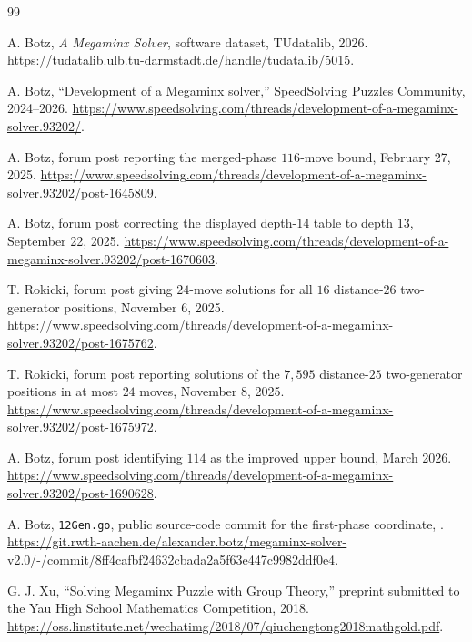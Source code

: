 \documentclass[11pt]{article}
\theoremstyle{definition}
\begin{document}
\small\raggedright
\begin{thebibliography}{99}

A. Botz,
\newblock \emph{A Megaminx Solver},
\newblock software dataset, TUdatalib, 2026.
\newblock \url{https://tudatalib.ulb.tu-darmstadt.de/handle/tudatalib/5015}.

A. Botz,
\newblock ``Development of a Megaminx solver,''
\newblock SpeedSolving Puzzles Community, 2024--2026.
\newblock \url{https://www.speedsolving.com/threads/development-of-a-megaminx-solver.93202/}.

A. Botz,
\newblock forum post reporting the merged-phase $116$-move bound,
\newblock February 27, 2025.
\newblock \url{https://www.speedsolving.com/threads/development-of-a-megaminx-solver.93202/post-1645809}.

A. Botz,
\newblock forum post correcting the displayed depth-$14$ table to depth $13$,
\newblock September 22, 2025.
\newblock \url{https://www.speedsolving.com/threads/development-of-a-megaminx-solver.93202/post-1670603}.

T. Rokicki,
\newblock forum post giving $24$-move solutions for all $16$ distance-$26$ two-generator positions,
\newblock November 6, 2025.
\newblock \url{https://www.speedsolving.com/threads/development-of-a-megaminx-solver.93202/post-1675762}.

T. Rokicki,
\newblock forum post reporting solutions of the $7{,}595$ distance-$25$ two-generator positions in at most $24$ moves,
\newblock November 8, 2025.
\newblock \url{https://www.speedsolving.com/threads/development-of-a-megaminx-solver.93202/post-1675972}.

A. Botz,
\newblock forum post identifying $114$ as the improved upper bound,
\newblock March 2026.
\newblock \url{https://www.speedsolving.com/threads/development-of-a-megaminx-solver.93202/post-1690628}.

A. Botz,
\newblock \texttt{12Gen.go}, public source-code commit for the first-phase coordinate,
.
\newblock \url{https://git.rwth-aachen.de/alexander.botz/megaminx-solver-v2.0/-/commit/8ff4cafbf24632cbada2a5f63e447c9982ddf0e4}.

G. J. Xu,
\newblock ``Solving Megaminx Puzzle with Group Theory,''
\newblock preprint submitted to the Yau High School Mathematics Competition, 2018.
\newblock \url{https://oss.linstitute.net/wechatimg/2018/07/qiuchengtong2018mathgold.pdf}.


\end{thebibliography}
\end{document}
